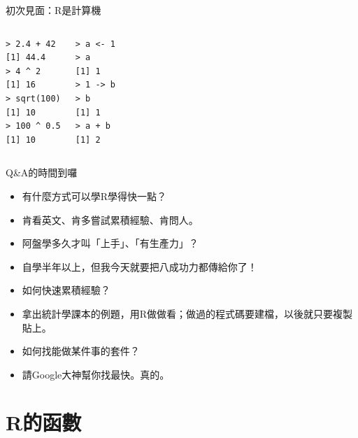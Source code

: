 \documentclass[12pt]{beamer}
\begin{document}
\begin{frame}[fragile]{初次見面：R是計算機}
\begin{columns}
\begin{verbatim}
> 2.4 + 42
[1] 44.4
> 4 ^ 2
[1] 16
> sqrt(100)
[1] 10
> 100 ^ 0.5
[1] 10
\end{verbatim}

\begin{verbatim}
> a <- 1
> a
[1] 1
> 1 -> b
> b
[1] 1
> a + b
[1] 2
\end{verbatim}

\end{columns}
\end{frame}


\begin{frame}[fragile]{Q\&A的時間到囉}
\begin{itemize}
\item[Q] 有什麼方式可以學R學得快一點？
\item[A] 肯看英文、肯多嘗試累積經驗、肯問人。
\end{itemize}
\begin{itemize}
\item[Q] 阿盤學多久才叫「上手」、「有生產力」？
\item[A] 自學半年以上，但我今天就要把八成功力都傳給你了！
\end{itemize}
\begin{itemize}
\item[Q] 如何快速累積經驗？
\item[A] 拿出統計學課本的例題，用R做做看；做過的程式碼要建檔，以後就只要複製貼上。
\end{itemize}
\begin{itemize}
\item[Q] 如何找能做某件事的套件？
\item[A] 請Google大神幫你找最快。真的。
\end{itemize}
\end{frame}

\section{R的函數}\subsection{}
\end{document}
